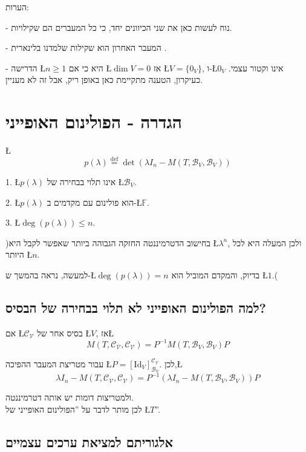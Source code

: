 \documentclass[english,hebrew]{article}
\theoremstyle{plain}
\begin{document}
הערות:

- נוח לעשות כאן את שני הכיוונים יחד, כי כל המעברים הם שקילויות.

- המעבר האחרון הוא שקילות שלמדנו בלינארית {\endL}.

- הדרישה \L{$n\ge1$} היא כי אם \L{$\dim V=0$} אז \L{$V=\{0_{V}\}$},
ו-\L{$0_{V}$} אינו וקטור עצמי. כעיקרון, הטענה מתקיימת כאן באופן ריק,
אבל זה לא מעניין. 

\section{הגדרה - הפולינום האופייני}

\L{%
\[
p(\lambda)\overset{\text{def}}{=}\det(\lambda I_{n}-M(T,\mathcal{B}_{V},\mathcal{B}_{V}))
\]
}%

1. \L{$p(\lambda)$} אינו תלוי בבחירה של \L{$\mathcal{B}_{V}$}.

2. \L{$p(\lambda)$} הוא פולינום עם מקדמים ב-\L{$\mathbb{F}$}.

3. \L{$\deg(p(\lambda))\leq n$}.

)בחישוב הדטרמיננטה החזקה הגבוהה ביותר שאפשר לקבל היא \L{$\lambda^{n}$},
ולכן המעלה היא לכל היותר \L{$n$}.

למעשה, נראה בהמשך ש-\L{$\deg(p(\lambda))=n$} בדיוק, והמקדם המוביל
הוא \L{$1$}.(

\subsection{למה הפולינום האופייני לא תלוי בבחירה של הבסיס?}

אם \L{$\mathcal{\mathcal{C}_{V}}$} בסיס אחר של \L{$V$}, אז\L{%
\[
M(T,\mathcal{\mathcal{C}_{V}},\mathcal{\mathcal{C}_{V}})=P^{-1}M(T,\mathcal{B}_{V},\mathcal{B}_{V})P
\]
}%

עבור מטריצת המעבר ההפיכה \L{$P=[\text{Id}_{V}]_{\mathcal{B}_{V}}^{\mathcal{\mathcal{C}_{V}}}$}.
לכן,\L{%
\[
\lambda I_{n}-M(T,\mathcal{\mathcal{C}_{V}},\mathcal{\mathcal{C}_{V}})=P^{-1}(\lambda I_{n}-M(T,\mathcal{B}_{V},\mathcal{B}_{V}))P
\]
}%

ולמטריצות דומות יש אותה דטרמיננטה.\\

לכן מותר לדבר על \textquotedblright הפולינום האופייני של \L{$T$}\textquotedblright . 

\subsection{אלגוריתם למציאת ערכים עצמיים}
\end{document}
